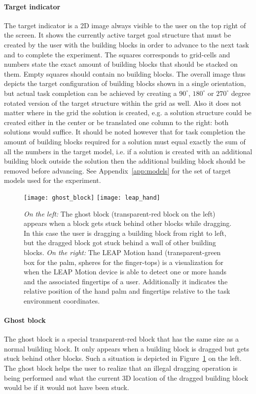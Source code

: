 \paragraph{Target indicator}
The target indicator is a 2D image always visible to the user on the top right of the screen. It shows the currently active target goal structure that must be created by the user with the building blocks in order to advance to the next task and to complete the experiment. The squares corresponds to grid-cells and numbers state the exact amount of building blocks that should be stacked on them. Empty squares should contain no building blocks. The overall image thus depicts the target configuration of building blocks shown in a single orientation, but actual task completion can be achieved by creating a $90^{\circ}$, $180^{\circ}$ or $270^{\circ}$ degree rotated version of the target structure within the grid as well. Also it does not matter where in the grid the solution is created, e.g. a solution structure could be created either in the center or be translated one column to the right: both solutions would suffice. It should be noted however that for task completion the amount of building blocks required for a solution must equal exactly the sum of all the numbers in the target model, i.e. if a solution is created with an additional building block outside the solution then the additional building block should be removed before advancing. See Appendix~\ref{app:models} for the set of target models used for the experiment.


\begin{figure}[H]
\centering
\texttt{[image: ghost\_block]}
\texttt{[image: leap\_hand]}
\caption{\label{fig:ghostblock} \textit{On the left:} The ghost block (transparent-red block on the left) appears when a block gets stuck behind other blocks while dragging. In this case the user is dragging a building block from right to left, but the dragged block got stuck behind a wall of other building blocks. \textit{On the right:} The LEAP Motion hand (transparent-green box for the palm, spheres for the finger-tops) is a visualization for when the LEAP Motion device is able to detect one or more hands and the associated fingertips of a user. Additionally it indicates the relative position of the hand palm and fingertips relative to the task environment coordinates. 
}
\end{figure}

\paragraph{Ghost block}
The ghost block is a special transparent-red block that has the same size as a normal building block. It only appears when a building block is dragged but gets stuck behind other blocks. Such a situation is depicted in Figure~\ref{fig:ghostblock} on the left. The ghost block helps the user to realize that an illegal dragging operation is being performed and what the current 3D location of the dragged building block would be if it would not have been stuck.


